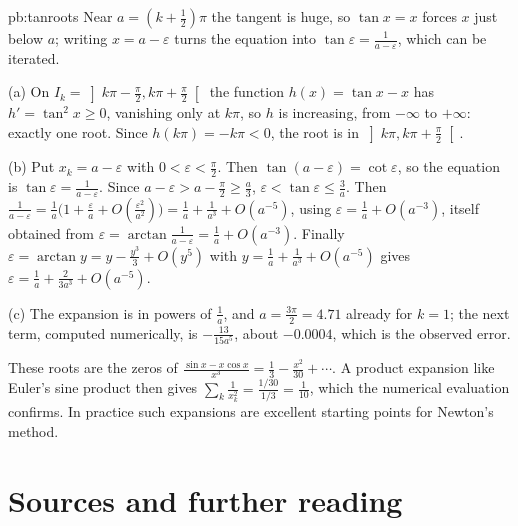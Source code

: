 \begin{solution}{pb:tanroots}
\idea Near $a=(k+\frac12)\pi$ the tangent is huge, so $\tan x=x$ forces $x$ just below $a$; writing $x=a-\varepsilon$ turns the equation into $\tan\varepsilon=\frac1{a-\varepsilon}$, which can be iterated.

\writeup (a) On $I_k=\left]k\pi-\frac\pi2,k\pi+\frac\pi2\right[$ the function $h(x)=\tan x-x$ has $h'=\tan^2x\ge0$, vanishing only at $k\pi$, so $h$ is increasing, from $-\infty$ to $+\infty$: exactly one root.
Since $h(k\pi)=-k\pi<0$, the root is in $\left]k\pi,k\pi+\frac\pi2\right[$.

(b) Put $x_k=a-\varepsilon$ with $0<\varepsilon<\frac\pi2$. Then $\tan(a-\varepsilon)=\cot\varepsilon$, so the equation is $\tan\varepsilon=\frac1{a-\varepsilon}$. Since $a-\varepsilon>a-\frac\pi2\ge\frac a3$, $\varepsilon<\tan\varepsilon\le\frac3a$. Then
$\frac1{a-\varepsilon}=\frac1a\bigl(1+\frac\varepsilon a+O(\frac{\varepsilon^2}{a^2})\bigr)=\frac1a+\frac1{a^3}+O(a^{-5})$, using $\varepsilon=\frac1a+O(a^{-3})$, itself obtained from $\varepsilon=\arctan\frac1{a-\varepsilon}=\frac1a+O(a^{-3})$. Finally
$\varepsilon=\arctan y=y-\frac{y^3}3+O(y^5)$ with $y=\frac1a+\frac1{a^3}+O(a^{-5})$ gives $\varepsilon=\frac1a+\frac2{3a^3}+O(a^{-5})$.

(c) The expansion is in powers of $\frac1a$, and $a=\frac{3\pi}2=4.71$ already for $k=1$; the next term, computed numerically, is $-\frac{13}{15a^5}$, about $-0.0004$, which is the
observed error.

\leads These roots are the zeros of $\frac{\sin x-x\cos x}{x^3}=\frac13-\frac{x^2}{30}+\cdots$. A product expansion like Euler's sine product then gives $\sum_k\frac1{x_k^2}=\frac{1/30}{1/3}=\frac1{10}$, which the
numerical evaluation confirms. In practice such expansions are excellent starting points for Newton's method.
\end{solution}

\section*{Sources and further reading}

